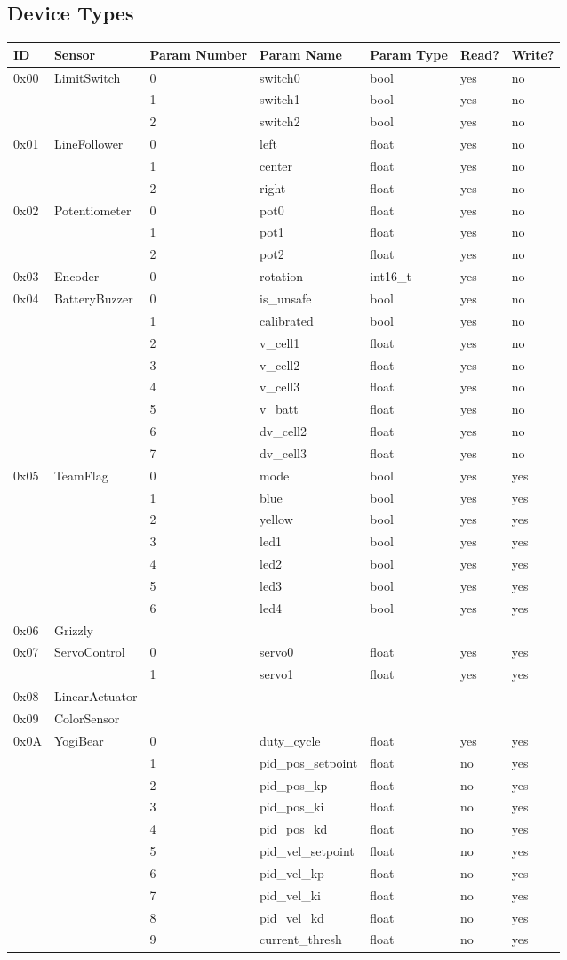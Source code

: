 \documentclass[12pt]{book}
\begin{document}
\subsection{Device Types}
\begin{longtable}[c]{@{}|l|l|l|l|l|l|l|@{}}
\toprule
ID & Sensor & Param Number & Param Name & Param Type & Read? &
Write?\tabularnewline
\midrule
\endhead
\hline
0x00 & LimitSwitch & 0 & switch0 & bool & yes & no\tabularnewline
& & 1 & switch1 & bool & yes & no\tabularnewline
& & 2 & switch2 & bool & yes & no\tabularnewline
0x01 & LineFollower & 0 & left & float & yes & no\tabularnewline
& & 1 & center & float & yes & no\tabularnewline
& & 2 & right & float & yes & no\tabularnewline
0x02 & Potentiometer & 0 & pot0 & float & yes & no\tabularnewline
& & 1 & pot1 & float & yes & no\tabularnewline
& & 2 & pot2 & float & yes & no\tabularnewline
0x03 & Encoder & 0 & rotation & int16\_t & yes & no\tabularnewline
0x04 & BatteryBuzzer & 0 & is\_unsafe & bool & yes & no\tabularnewline
& & 1 & calibrated & bool & yes & no\tabularnewline
& & 2 & v\_cell1 & float & yes & no\tabularnewline
& & 3 & v\_cell2 & float & yes & no\tabularnewline
& & 4 & v\_cell3 & float & yes & no\tabularnewline
& & 5 & v\_batt & float & yes & no\tabularnewline
& & 6 & dv\_cell2 & float & yes & no\tabularnewline
& & 7 & dv\_cell3 & float & yes & no\tabularnewline
0x05 & TeamFlag & 0 & mode & bool & yes & yes\tabularnewline
& & 1 & blue & bool & yes & yes\tabularnewline
& & 2 & yellow & bool & yes & yes\tabularnewline
& & 3 & led1 & bool & yes & yes\tabularnewline
& & 4 & led2 & bool & yes & yes\tabularnewline
& & 5 & led3 & bool & yes & yes\tabularnewline
& & 6 & led4 & bool & yes & yes\tabularnewline
0x06 & Grizzly & & & & &\tabularnewline
0x07 & ServoControl & 0 & servo0 & float & yes & yes\tabularnewline
& & 1 & servo1 & float & yes & yes\tabularnewline
0x08 & LinearActuator & & & & &\tabularnewline
0x09 & ColorSensor & & & & &\tabularnewline
0x0A & YogiBear & 0 & duty\_cycle & float & yes & yes\tabularnewline
& & 1 & pid\_pos\_setpoint & float & no & yes\tabularnewline
& & 2 & pid\_pos\_kp & float & no & yes\tabularnewline
& & 3 & pid\_pos\_ki & float & no & yes\tabularnewline
& & 4 & pid\_pos\_kd & float & no & yes\tabularnewline
& & 5 & pid\_vel\_setpoint & float & no & yes\tabularnewline
& & 6 & pid\_vel\_kp & float & no & yes\tabularnewline
& & 7 & pid\_vel\_ki & float & no & yes\tabularnewline
& & 8 & pid\_vel\_kd & float & no & yes\tabularnewline
& & 9 & current\_thresh & float & no & yes\tabularnewline

\end{longtable}
\end{document}
